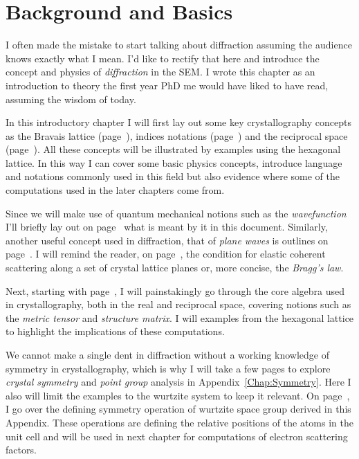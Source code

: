 \chapter{Background and Basics} %
\label{chap:Background} 
I often made the mistake to start talking about diffraction assuming the audience knows exactly what I mean. I'd like to rectify that here and introduce the concept and physics of \textit{diffraction} in the SEM. I wrote this chapter as an introduction to theory the first year PhD me would have liked to have read, assuming the wisdom of today. 

In this introductory chapter I will first lay out some key crystallography concepts as the Bravais lattice (page~\pageref{Sect:spaceLattice}), indices notations (page~\pageref{subChap:MB indices}) and the reciprocal space (page~\pageref{sec:recMB}). All these concepts will be illustrated by examples using the hexagonal lattice. In this way I can cover some basic physics concepts, introduce language and notations commonly used in this field but also evidence where some of the computations used in the later chapters come from. 

Since we will make use of quantum mechanical notions such as the \textit{wavefunction} I'll briefly lay out on page~\pageref{sec:wave} what is meant by it in this document. Similarly, another useful concept used in diffraction, that of \textit{plane waves} is outlines on page~\pageref{Fig:planeWaves}. 
I will remind the reader, on page~\pageref{Sec:Bragg},  the condition for  elastic coherent scattering along a set of crystal lattice planes or, more concise, the \textit{Bragg's law}. 


Next, starting with page~\pageref{chap:real+recAlg}, I will painstakingly go through the core algebra used in crystallography, both in the real and reciprocal space, covering notions such as the \textit{metric tensor} and \textit{structure matrix}. I will examples from the hexagonal lattice to highlight the implications of these computations. 


We cannot make a single dent in diffraction without a working knowledge of symmetry in crystallography, which is why I will take a few pages to explore \textit{crystal symmetry} and \textit{point group} analysis in Appendix~\ref{Chap:Symmetry}. Here I also will limit the examples to the wurtzite system to keep it relevant. On page~\pageref{sec:Wsymmetry}, I go over the defining symmetry operation of wurtzite space group derived in this Appendix. These operations are defining the relative positions of the atoms in the unit cell and  will be used in next chapter for computations of electron scattering factors.  


